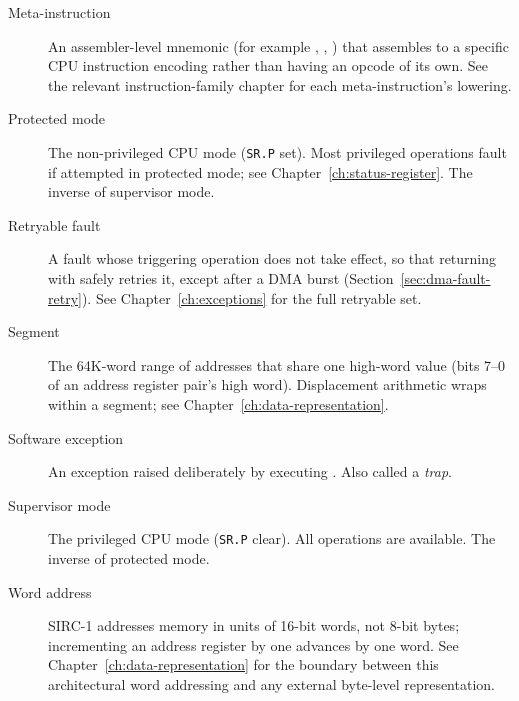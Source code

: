 \begin{description}
	\item[Meta-instruction] An assembler-level mnemonic (for example , , ) that
	      assembles to a specific CPU instruction encoding rather than having an opcode of its own. See the relevant
	      instruction-family chapter for each meta-instruction's lowering.
	\item[Protected mode] The non-privileged CPU mode (\texttt{SR.P} set). Most privileged operations fault if attempted in
	      protected mode; see Chapter~\ref{ch:status-register}. The inverse of supervisor mode.
	\item[Retryable fault] A fault whose triggering operation does not take effect, so that returning with  safely
	      retries it, except after a DMA burst (Section~\ref{sec:dma-fault-retry}). See Chapter~\ref{ch:exceptions} for the full
	      retryable set.
	\item[Segment] The 64K-word range of addresses that share one high-word value (bits 7--0 of an address register pair's high
	      word). Displacement arithmetic wraps within a segment; see Chapter~\ref{ch:data-representation}.
	\item[Software exception] An exception raised deliberately by executing . Also called a \textit{trap}.
	\item[Supervisor mode] The privileged CPU mode (\texttt{SR.P} clear). All operations are available. The inverse of protected
	      mode.
	\item[Word address] SIRC-1 addresses memory in units of 16-bit words, not 8-bit bytes; incrementing an address register by
	      one advances by one word. See Chapter~\ref{ch:data-representation} for the boundary between this architectural word
	      addressing and any external byte-level representation.
\end{description}
